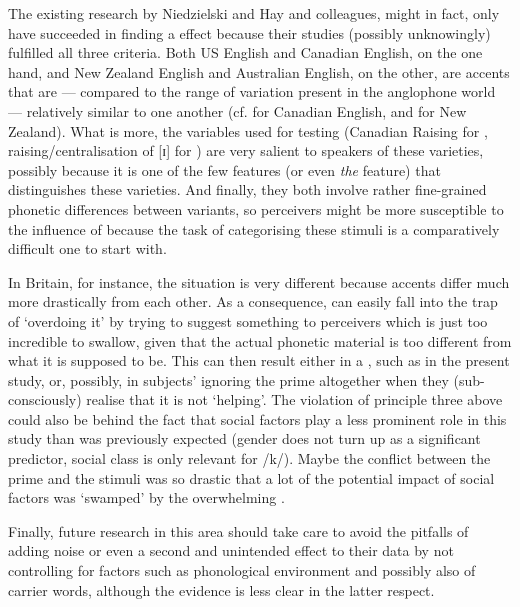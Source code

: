 The existing research by Niedzielski and Hay and colleagues, might in fact, only have succeeded in finding a  effect because their studies (possibly unknowingly) fulfilled all three criteria.
Both US English and Canadian English, on the one hand, and New Zealand English and Australian English, on the other, are accents that are --- compared to the range of variation present in the anglophone world --- relatively similar to one another (cf. \citealt[31]{halford2002} for Canadian English, and \citealt[354]{hayetal2006a}for New Zealand).
What is more, the variables used for testing (Canadian Raising for \citealt{niedzielski1999}, raising/centralisation of [ɪ] for \citealt{hayetal2006a,haydrager2010}) are very salient to speakers of these varieties, possibly because it is one of the few features (or even \emph{the} feature) that distinguishes these varieties.
And finally, they both involve rather fine-grained phonetic differences between variants, so perceivers might be more susceptible to the influence of  because the task of categorising these stimuli is a comparatively difficult one to start with.

In Britain, for instance, the situation is very different because accents differ much more drastically from each other.
As a consequence,  can easily fall into the trap of `overdoing it' by trying to suggest something to perceivers which is just too incredible to swallow, given that the actual phonetic material is too different from what it is supposed to be.
This can then result either in a , such as in the present study, or, possibly, in subjects' ignoring the prime altogether \parencite[like in][]{lawrence2015} when they (sub-consciously) realise that it is not `helping'.
The violation of principle three above could also be behind the fact that social factors play a less prominent role in this study than was previously expected (gender does not turn up as a significant predictor, social class is only relevant for /k/).
Maybe the conflict between the prime and the stimuli was so drastic that a lot of the potential impact of social factors was `swamped' by the overwhelming .

Finally, future research in this area should take care to avoid the pitfalls of adding noise or even a second and unintended  effect to their data by not controlling for factors such as phonological environment and possibly also  of carrier words, although the evidence is less clear in the latter respect.

